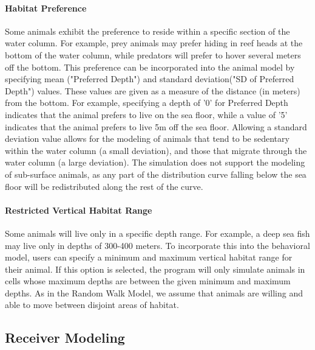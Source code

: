 \paragraph{Habitat Preference}
\label{habitatPref}
Some animals exhibit the preference to reside within a specific section of the water column.  For example, prey animals may prefer hiding in reef heads at the bottom of the water column, while predators will prefer to hover several meters off the bottom.  This preference can be incorporated into the animal model by specifying mean ("Preferred Depth") and standard deviation("SD of Preferred Depth") values.  These values are given as a measure of the distance (in meters) from the bottom.  For example, specifying a depth of '0' for Preferred Depth indicates that the animal prefers to live on the sea floor, while a value of '5' indicates that the animal prefers to live 5m off the sea floor.  Allowing a standard deviation value allows for the modeling of animals that tend to be sedentary within the water column (a small deviation), and those that migrate through the water column (a large deviation).  The simulation does not support the modeling of sub-surface animals, as any part of the distribution curve falling below the sea floor will be redistributed along the rest of the curve. 


\paragraph{Restricted Vertical Habitat Range}
\label{restrictedVerticalHabitat}
Some animals will live only in a specific depth range.  For example, a deep sea fish may live only in depths of 300-400 meters.  To incorporate this into the behavioral model, users can specify a minimum and maximum vertical habitat range for their animal.  If this option is selected, the program will only simulate animals in cells whose maximum depths are between the given minimum and maximum depths.  As in the Random Walk Model, we assume that animals are willing and able to move between disjoint areas of habitat.


\subsection{Receiver Modeling}
\label{receiverModel}


